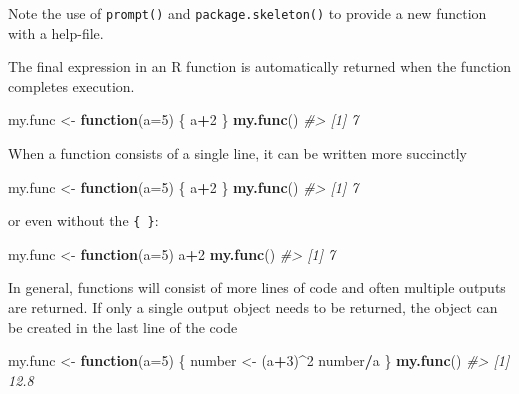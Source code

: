 \documentclass[
]{book}
\newenvironment{Shaded}{\begin{snugshade}}{\end{snugshade}}
\newcommand{\AttributeTok}[1]{\textcolor[rgb]{0.13,0.29,0.53}{#1}}
\newcommand{\CommentTok}[1]{\textcolor[rgb]{0.56,0.35,0.01}{\textit{#1}}}
\newcommand{\ControlFlowTok}[1]{\textcolor[rgb]{0.13,0.29,0.53}{\textbf{#1}}}
\newcommand{\DecValTok}[1]{\textcolor[rgb]{0.00,0.00,0.81}{#1}}
\newcommand{\FunctionTok}[1]{\textcolor[rgb]{0.13,0.29,0.53}{\textbf{#1}}}
\newcommand{\NormalTok}[1]{#1}
\newcommand{\OtherTok}[1]{\textcolor[rgb]{0.56,0.35,0.01}{#1}}
\newcommand{\SpecialCharTok}[1]{\textcolor[rgb]{0.81,0.36,0.00}{\textbf{#1}}}
\begin{document}
Note the use of \texttt{prompt()} and \texttt{package.skeleton()} to provide a new function with a help-file.

The final expression in an R function is automatically returned when the function completes execution.

\begin{Shaded}
\begin{Highlighting}[]
\NormalTok{my.func }\OtherTok{\textless{}{-}} \ControlFlowTok{function}\NormalTok{(}\AttributeTok{a=}\DecValTok{5}\NormalTok{) }
\NormalTok{\{  a}\SpecialCharTok{+}\DecValTok{2}
\NormalTok{\}}
\FunctionTok{my.func}\NormalTok{()}
\CommentTok{\#\textgreater{} [1] 7}
\end{Highlighting}
\end{Shaded}

When a function consists of a single line, it can be written more succinctly

\begin{Shaded}
\begin{Highlighting}[]
\NormalTok{my.func }\OtherTok{\textless{}{-}} \ControlFlowTok{function}\NormalTok{(}\AttributeTok{a=}\DecValTok{5}\NormalTok{) \{  a}\SpecialCharTok{+}\DecValTok{2}\NormalTok{  \}}
\FunctionTok{my.func}\NormalTok{()}
\CommentTok{\#\textgreater{} [1] 7}
\end{Highlighting}
\end{Shaded}

or even without the \texttt{\{\ \}}:

\begin{Shaded}
\begin{Highlighting}[]
\NormalTok{my.func }\OtherTok{\textless{}{-}} \ControlFlowTok{function}\NormalTok{(}\AttributeTok{a=}\DecValTok{5}\NormalTok{) a}\SpecialCharTok{+}\DecValTok{2}
\FunctionTok{my.func}\NormalTok{()}
\CommentTok{\#\textgreater{} [1] 7}
\end{Highlighting}
\end{Shaded}

In general, functions will consist of more lines of code and often multiple outputs are returned. If only a single output object needs to be returned, the object can be created in the last line of the code

\begin{Shaded}
\begin{Highlighting}[]
\NormalTok{my.func }\OtherTok{\textless{}{-}} \ControlFlowTok{function}\NormalTok{(}\AttributeTok{a=}\DecValTok{5}\NormalTok{)}
\NormalTok{  \{  number }\OtherTok{\textless{}{-}}\NormalTok{ (a}\SpecialCharTok{+}\DecValTok{3}\NormalTok{)}\SpecialCharTok{\^{}}\DecValTok{2}
\NormalTok{     number}\SpecialCharTok{/}\NormalTok{a}
\NormalTok{  \}}
\FunctionTok{my.func}\NormalTok{()}
\CommentTok{\#\textgreater{} [1] 12.8}
\end{Highlighting}
\end{Shaded}
\end{document}

